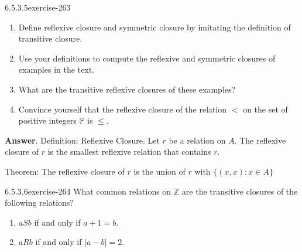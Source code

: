 \documentclass[twoside,10pt,]{book}
\numberwithin{equation}{section}
\begin{document}
\begin{divisionsolution}{6.5.3.5}{}{exercise-263}%
\hypertarget{p-2222}{}%
\leavevmode%
\begin{enumerate}[label=(\alph*)]
\item\hypertarget{li-1164}{}\hypertarget{p-2223}{}%
Define reflexive closure and symmetric closure by imitating the definition of transitive closure.%
\item\hypertarget{li-1165}{}\hypertarget{p-2224}{}%
Use your definitions to compute the reflexive and symmetric closures of examples in the text.%
\item\hypertarget{li-1166}{}\hypertarget{p-2225}{}%
What are the transitive reflexive closures of these examples?%
\item\hypertarget{li-1167}{}\hypertarget{p-2226}{}%
Convince yourself that the reflexive closure of the relation \(<\) on the set of positive integers \(\mathbb{P}\) is \(\leq\).%
\end{enumerate}
%
\par\smallskip%
\noindent\textbf{Answer}.\quad%
\hypertarget{p-2227}{}%
Definition: Reflexive Closure.  Let \(r\) be a relation on \(A\). The reflexive closure of \(r\) is the smallest reflexive relation that contains \(r\).%
\par
\hypertarget{p-2228}{}%
Theorem: The reflexive closure of \(r\) is the union of \(r\) with \(\{(x, x) : x\in A\}\)%
\end{divisionsolution}%
\begin{divisionsolution}{6.5.3.6}{}{exercise-264}%
\hypertarget{p-2229}{}%
What common relations on \(\mathbb{Z}\) are the transitive closures of the following relations?%
\par
\hypertarget{p-2230}{}%
\leavevmode%
\begin{enumerate}[label=(\alph*)]
\item\hypertarget{li-1168}{}\hypertarget{p-2231}{}%
\(a S b\) if and only if \(a + 1 = b\).%
\item\hypertarget{li-1169}{}\hypertarget{p-2232}{}%
\(a R b\) if and only if \(| a - b | = 2\).%
\end{enumerate}
%
\end{divisionsolution}%
\end{document}

